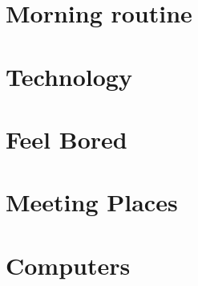 \documentclass[conference]{IEEEtran}
\begin{document}
\section{Morning routine}

\section{Technology}

\section{Feel Bored}

\section{Meeting Places}

\section{Computers}
\end{document}
